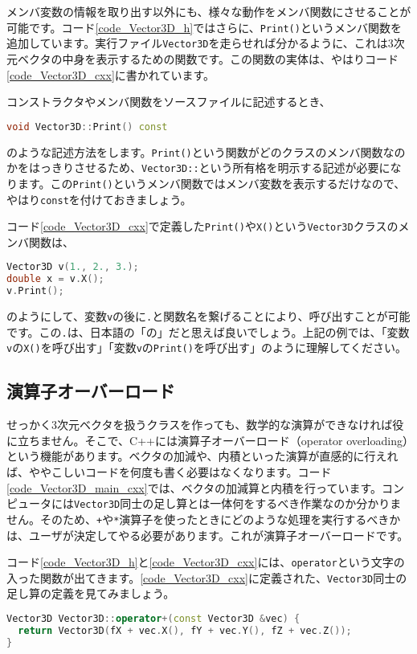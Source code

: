 メンバ変数の情報を取り出す以外にも、様々な動作をメンバ関数にさせることが可能です。コード\ref{code_Vector3D_h}ではさらに、\texttt{Print()}というメンバ関数を追加しています。実行ファイル\texttt{Vector3D}を走らせれば分かるように、これは3次元ベクタの中身を表示するための関数です。この関数の実体は、やはりコード\ref{code_Vector3D_cxx}に書かれています。

コンストラクタやメンバ関数をソースファイルに記述するとき、
\begin{lstlisting}[language=c++]
void Vector3D::Print() const
\end{lstlisting}
のような記述方法をします。\texttt{Print()}という関数がどのクラスのメンバ関数なのかをはっきりさせるため、\texttt{Vector3D::}という所有格を明示する記述が必要になります。この\texttt{Print()}というメンバ関数ではメンバ変数を表示するだけなので、やはり\texttt{const}を付けておきましょう。

コード\ref{code_Vector3D_cxx}で定義した\texttt{Print()}や\texttt{X()}という\texttt{Vector3D}クラスのメンバ関数は、
\begin{lstlisting}[language=c++]
Vector3D v(1., 2., 3.);
double x = v.X();
v.Print();
\end{lstlisting}
のようにして、変数\texttt{v}の後に\texttt{.}と関数名を繋げることにより、呼び出すことが可能です。この\texttt{.}は、日本語の「の」だと思えば良いでしょう。上記の例では、「変数\texttt{v}の\texttt{X()}を呼び出す」「変数\texttt{v}の\texttt{Print()}を呼び出す」のように理解してください。

\subsection{演算子オーバーロード}
\label{subsec:演算子オーバーロード}
せっかく3次元ベクタを扱うクラスを作っても、数学的な演算ができなければ役に立ちません。そこで、C++には演算子オーバーロード（operator overloading）という機能があります。ベクタの加減や、内積といった演算が直感的に行えれば、ややこしいコードを何度も書く必要はなくなります。コード\ref{code_Vector3D_main_cxx}では、ベクタの加減算と内積を行っています。コンピュータには\texttt{Vector3D}同士の足し算とは一体何をするべき作業なのか分かりません。そのため、\texttt{+}や\texttt{*}演算子を使ったときにどのような処理を実行するべきかは、ユーザが決定してやる必要があります。これが演算子オーバーロードです。

コード\ref{code_Vector3D_h}と\ref{code_Vector3D_cxx}には、\texttt{operator}という文字の入った関数が出てきます。\ref{code_Vector3D_cxx}に定義された、\texttt{Vector3D}同士の足し算の定義を見てみましょう。
\begin{lstlisting}[language=c++]
Vector3D Vector3D::operator+(const Vector3D &vec) {
  return Vector3D(fX + vec.X(), fY + vec.Y(), fZ + vec.Z());
}
\end{lstlisting}

